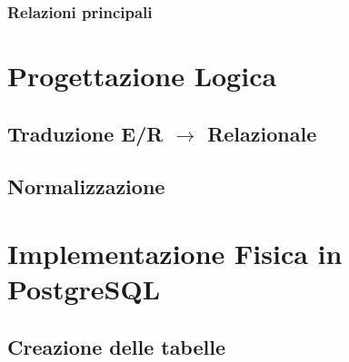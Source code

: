 \documentclass[12pt, a4paper, twoside, openright]{article}
\begin{document}

\subsubsection{Relazioni principali}


\newpage

\section{Progettazione Logica}
\minitoc
\vspace{1cm}

\subsection{Traduzione E/R $\rightarrow$ Relazionale}


\subsection{Normalizzazione}


\newpage

\section{Implementazione Fisica in PostgreSQL}
\minitoc
\vspace{1cm}

\subsection{Creazione delle tabelle}

\end{document}
